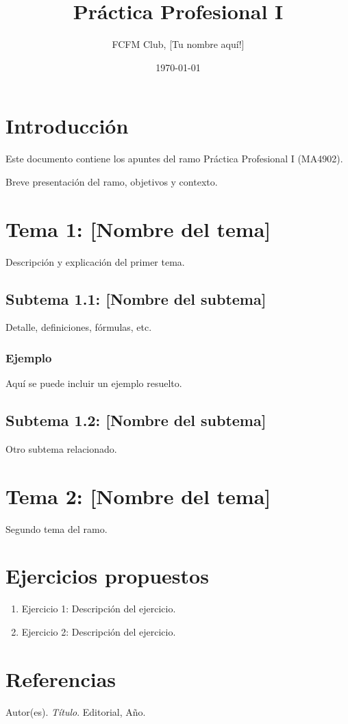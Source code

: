 \documentclass[12pt]{article}
\title{Práctica Profesional I}
\author{FCFM Club, [Tu nombre aquí!]}
\date{\today}
\begin{document}
\maketitle
\tableofcontents
\newpage

\section{Introducción}
Este documento contiene los apuntes del ramo Práctica Profesional I (MA4902).

Breve presentación del ramo, objetivos y contexto.

\section{Tema 1: [Nombre del tema]}
Descripción y explicación del primer tema.

\subsection{Subtema 1.1: [Nombre del subtema]}
Detalle, definiciones, fórmulas, etc.

\subsubsection{Ejemplo}
Aquí se puede incluir un ejemplo resuelto.

\subsection{Subtema 1.2: [Nombre del subtema]}
Otro subtema relacionado.

\section{Tema 2: [Nombre del tema]}
Segundo tema del ramo.


\section{Ejercicios propuestos}
\begin{enumerate}
    \item Ejercicio 1: Descripción del ejercicio.
    \item Ejercicio 2: Descripción del ejercicio.
\end{enumerate}

\section{Referencias}
\begin{thebibliography}{9}
     Autor(es). \textit{Título}. Editorial, Año.
\end{thebibliography}
\end{document}
